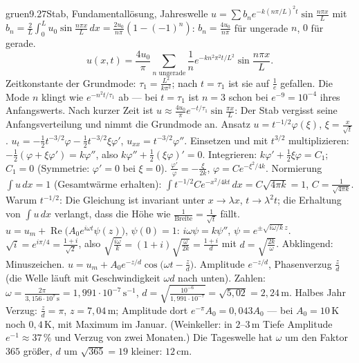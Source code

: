 \begin{loesungkarte}{gruen}{9.27}{Stab, Fundamentallösung, Jahreswelle}
$u = \sum b_ne^{-k(n\pi/L)^{2}t}\sin\frac{n\pi x}L$ mit $b_n = \frac2L\int_0^{L}u_0\sin\frac{n\pi x}L\,dx = \frac{2u_0}{n\pi}(1 - (-1)^{n})$: $b_n = \frac{4u_0}{n\pi}$ für ungerade $n$, $0$ für gerade.
\[ u(x, t) = \frac{4u_0}\pi\sum_{n\text{ ungerade}}\frac1ne^{-kn^{2}\pi^{2}t/L^{2}}\sin\frac{n\pi x}L. \]
Zeitkonstante der Grundmode: $\tau_1 = \frac{L^{2}}{k\pi^{2}}$; nach $t = \tau_1$ ist sie auf $\frac1e$ gefallen. Die Mode $n$ klingt wie $e^{-n^{2}t/\tau_1}$ ab --- bei $t = \tau_1$ ist $n = 3$ schon bei $e^{-9} = 10^{-4}$ ihres Anfangswerts. Nach kurzer Zeit ist $u\approx\frac{4u_0}\pi e^{-t/\tau_1}\sin\frac{\pi x}L$: Der Stab vergisst seine Anfangsverteilung und nimmt die Grundmode an.
Ansatz $u = t^{-1/2}\varphi(\xi)$, $\xi = \frac x{\sqrt t}$. $u_t = -\frac12t^{-3/2}\varphi - \frac12t^{-3/2}\xi\varphi'$, $u_{xx} = t^{-3/2}\varphi''$. Einsetzen und mit $t^{3/2}$ multiplizieren: $-\frac12(\varphi + \xi\varphi') = k\varphi''$, also $k\varphi'' + \frac12(\xi\varphi)' = 0$. Integrieren: $k\varphi' + \frac12\xi\varphi = C_1$; $C_1 = 0$ (Symmetrie: $\varphi' = 0$ bei $\xi = 0$). $\frac{\varphi'}\varphi = -\frac\xi{2k}$, $\varphi = Ce^{-\xi^{2}/4k}$. Normierung $\int u\,dx = 1$ (Gesamtwärme erhalten): $\int t^{-1/2}Ce^{-x^{2}/4kt}\,dx = C\sqrt{4\pi k} = 1$, $C = \frac1{\sqrt{4\pi k}}$. Warum $t^{-1/2}$: Die Gleichung ist invariant unter $x\to\lambda x$, $t\to\lambda^{2}t$; die Erhaltung von $\int u\,dx$ verlangt, dass die Höhe wie $\frac1{\text{Breite}} = \frac1{\sqrt t}$ fällt.
$u = u_m + \operatorname{Re}\bigl(A_0e^{i\omega t}\psi(z)\bigr)$, $\psi(0) = 1$: $i\omega\psi = k\psi''$, $\psi = e^{\pm\sqrt{i\omega/k}\,z}$. $\sqrt i = e^{i\pi/4} = \frac{1 + i}{\sqrt2}$, also $\sqrt{\frac{i\omega}k} = (1 + i)\sqrt{\frac\omega{2k}} = \frac{1 + i}d$ mit $d = \sqrt{\frac{2k}\omega}$. Abklingend: Minuszeichen. $u = u_m + A_0e^{-z/d}\cos\bigl(\omega t - \frac zd\bigr)$. Amplitude $e^{-z/d}$, Phasenverzug $\frac zd$ (die Welle läuft mit Geschwindigkeit $\omega d$ nach unten). Zahlen: $\omega = \frac{2\pi}{3{,}156\cdot10^{7}\,\mathrm s} = 1{,}991\cdot10^{-7}\,\mathrm{s^{-1}}$, $d = \sqrt{\frac{10^{-6}}{1{,}991\cdot10^{-7}}} = \sqrt{5{,}02} = 2{,}24\,\mathrm m$. Halbes Jahr Verzug: $\frac zd = \pi$, $z = 7{,}04\,\mathrm m$; Amplitude dort $e^{-\pi}A_0 = 0{,}043A_0$ --- bei $A_0 = 10\,\mathrm K$ noch $0{,}4\,\mathrm K$, mit Maximum im Januar. (Weinkeller: in $2$--$3\,\mathrm m$ Tiefe Amplitude $e^{-1}\approx37\,\%$ und Verzug von zwei Monaten.) Die Tageswelle hat $\omega$ um den Faktor $365$ größer, $d$ um $\sqrt{365} = 19$ kleiner: $12\,\mathrm{cm}$.

\end{loesungkarte}
